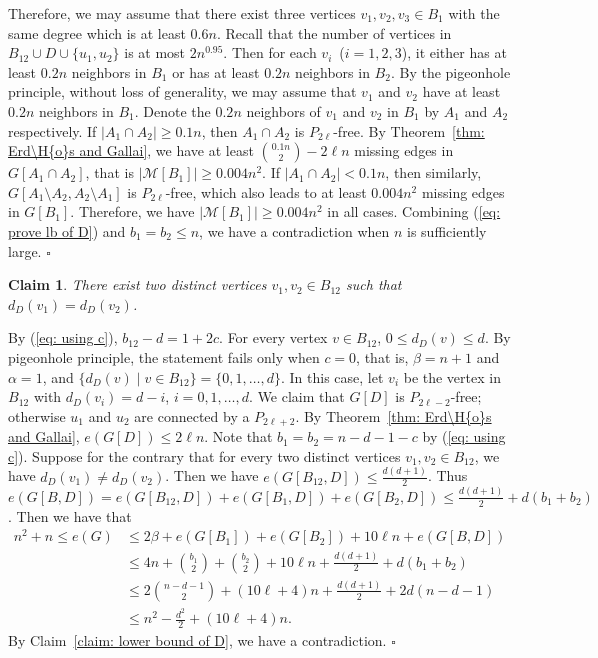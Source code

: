 \documentclass[12pt]{article}%
\newtheorem{claim}[theorem]{Claim}
\newenvironment{proof}{{\noindent\it Proof.}}{\hfill $\square$\par}
\begin{document}
\begin{proof}
	Therefore, we may assume that there exist three vertices $v_1, v_2, v_3 \in B_1$ with the same degree which is at least $0.6n$.
	Recall that the number of vertices in $B_{12}\cup D\cup \{u_1, u_2\}$ is at most $2n^{0.95}$.
	Then for each $v_i$~($i=1,2,3$), it either has at least $0.2n$ neighbors in $B_1$ or has at least $0.2n$ neighbors in $B_2$.
	By the pigeonhole principle, without loss of generality, we may assume that $v_1$ and $v_2$ have at least $0.2n$ neighbors in $B_1$.
	Denote the $0.2n$ neighbors of $v_1$ and $v_2$ in $B_1$ by $A_1$ and $A_2$ respectively.
	If $\left| A_1 \cap A_2 \right| \ge 0.1n$, then $A_1 \cap A_2$ is $P_{2\ell}$-free.
	By Theorem~\ref{thm: Erd\H{o}s and Gallai}, we have at least $\binom{0.1n}{2} - 2\ell n$ missing edges in $G[A_1 \cap A_2]$, that is $|\mathcal{M}[B_1]| \ge 0.004n^2$.
	If $\left| A_1 \cap A_2 \right| < 0.1n$, then similarly, $G[A_1\setminus A_2, A_2\setminus A_1]$ is $P_{2\ell}$-free, which also leads to at least $0.004n^2$ missing edges in $G[B_1]$.
	Therefore, we have $|\mathcal{M}[B_1]| \ge 0.004n^2$ in all cases.
	Combining (\ref{eq: prove lb of D}) and $b_1 = b_2 \le n$, we have a contradiction when $n$ is sufficiently large.
\end{proof}


\begin{claim}\label{claim: v1 v2 in B12}
	There exist two distinct vertices $v_1, v_2 \in B_{12}$ such that $d_D(v_1) = d_D(v_2)$.
\end{claim}

\begin{proof}
By (\ref{eq: using c}), $b_{12} - d = 1+2c$.
For every vertex $v \in B_{12}$, $0 \le d_D(v) \le d$.
By pigeonhole principle, the statement fails only when $c = 0$, that is, $\beta = n + 1$ and $\alpha = 1$, and $\{d_D(v) \mid v \in B_{12}\} = \{0,1,\ldots, d\}$.
In this case, let $v_i$ be the vertex in $B_{12}$ with $d_D(v_i) = d-i$, $i=0,1,\ldots,d$.
We claim that $G[D]$ is $P_{2\ell-2}$-free; otherwise $u_1$ and $u_2$ are connected by a $P_{2\ell+2}$.
By Theorem~\ref{thm: Erd\H{o}s and Gallai}, $e(G[D]) \le 2\ell n$.
Note that $b_1 = b_2 = n-d-1-c$ by (\ref{eq: using c}).
Suppose for the contrary that for every two distinct vertices $v_1,v_2\in B_{12}$, we have  $d_D(v_1)\neq d_D(v_2)$. Then we have $e(G[B_{12},D])\leq \frac{d(d+1)}{2}$. Thus $e(G[B,D])=e(G[B_{12},D])+e(G[B_1,D])+e(G[B_2,D])\leq \frac{d(d+1)}{2}+d(b_1+b_2)$.
Then we have that
\begin{equation*}
\begin{aligned}
	n^2 + n \le e(G) & \le 2\beta + e(G[B_1]) + e(G[B_2]) + 10\ell n  + e(G[B,D]) \\
	& \le 4n+ \binom{b_1}{2}+\binom{b_2}{2} + 10\ell n + \frac{d(d+1)}{2} + d(b_1+b_2)\\
	& \le  2\binom{n-d-1}{2} + (10\ell+4) n + \frac{d(d+1)}{2} + 2d(n-d-1)\\
	& \le n^2  - \frac{d^2}{2} + (10\ell+4) n.
\end{aligned}
\end{equation*}
By Claim~\ref{claim: lower bound of D}, we have  a contradiction.
\end{proof}
\end{document}

